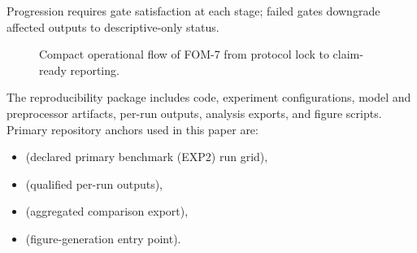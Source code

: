 \documentclass[twoside,11pt]{article}
\begin{document}
Progression requires gate satisfaction at each stage; failed gates downgrade
affected outputs to descriptive-only status.
\begin{figure}[t]
\centering
{}
\caption{Compact operational flow of FOM-7 from protocol lock to claim-ready reporting.}
\label{fig:fom7-flow}
\end{figure}

The reproducibility package includes code, experiment configurations, model and
preprocessor artifacts, per-run outputs, analysis exports, and figure scripts.
Primary repository anchors used in this paper are:
\begin{itemize}[leftmargin=*]
    \item {} (declared primary benchmark (EXP2) run grid),
    \item {} (qualified per-run outputs),
    \item {} (aggregated comparison export),
    \item {} (figure-generation entry point).
\end{itemize}
\end{document}

